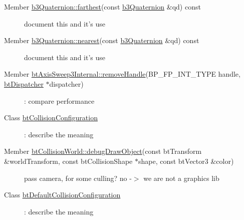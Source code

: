 \label{todo__todo000002}
\hypertarget{todo__todo000002}{}
 \begin{description}
\item[Member \hyperlink{classb3_quaternion_388e68921f4749a5641df37449076db0}{b3Quaternion::farthest}(const \hyperlink{classb3_quaternion}{b3Quaternion} \&qd) const  ]document this and it's use \end{description}


\label{todo__todo000003}
\hypertarget{todo__todo000003}{}
 \begin{description}
\item[Member \hyperlink{classb3_quaternion_c257faeb2bf5a223870603face96f002}{b3Quaternion::nearest}(const \hyperlink{classb3_quaternion}{b3Quaternion} \&qd) const  ]document this and it's use \end{description}


\label{todo__todo000008}
\hypertarget{todo__todo000008}{}
 \begin{description}
\item[Member \hyperlink{classbt_axis_sweep3_internal_4e26f4f8acf63f26451f6396223001bb}{btAxisSweep3Internal::removeHandle}(BP\_\-FP\_\-INT\_\-TYPE handle, \hyperlink{classbt_dispatcher}{btDispatcher} $\ast$dispatcher) ]: compare performance \end{description}


\label{todo__todo000010}
\hypertarget{todo__todo000010}{}
 \begin{description}
\item[Class \hyperlink{classbt_collision_configuration}{btCollisionConfiguration} ]: describe the meaning \end{description}


\label{todo__todo000011}
\hypertarget{todo__todo000011}{}
 \begin{description}
\item[Member \hyperlink{classbt_collision_world_c1ca6489c220005798069152c3df0d08}{btCollisionWorld::debugDrawObject}(const btTransform \&worldTransform, const btCollisionShape $\ast$shape, const btVector3 \&color) ]pass camera, for some culling? no -$>$ we are not a graphics lib \end{description}


\label{todo__todo000012}
\hypertarget{todo__todo000012}{}
 \begin{description}
\item[Class \hyperlink{classbt_default_collision_configuration}{btDefaultCollisionConfiguration} ]: describe the meaning \end{description}


